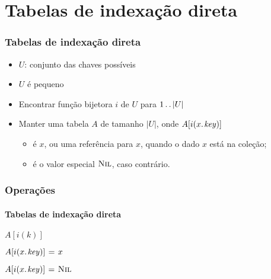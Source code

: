 \documentclass{beamer}
\begin{document}
\section{Tabelas de indexação direta}

\begin{frame}

  \frametitle{Tabelas de indexação direta}

  \begin{itemize}

    \item $U$: conjunto das chaves possíveis

    \item $U$ é \alert{pequeno}

    \item Encontrar função bijetora $i$ de $U$ para $1 \mathinner{\ldotp\ldotp} | U |$

    \item Manter uma tabela $A$ de tamanho $| U |$, onde $A[ i(\attrib{x}{key}) ]$ 

      \begin{itemize}

        \item é $x$, ou uma referência para $x$, quando o dado $x$ está na
          coleção;

        \item é o valor especial $\textnormal{\scshape Nil}$, caso contrário.

      \end{itemize}

  \end{itemize}

\end{frame}

\begin{frame}

  \frametitle{Operações}
  \framesubtitle{Tabelas de indexação direta}

  \begin{codebox}
    \zi \Return $A[ i( k )]$
  \end{codebox}

  \begin{codebox}
    \zi $A[ i( \attrib{x}{key} )] \gets x$
  \end{codebox}

  \begin{codebox}
    \zi $A[ i( \attrib{x}{key} )] \gets \const{Nil}$
  \end{codebox}

\end{frame}
\end{document}
